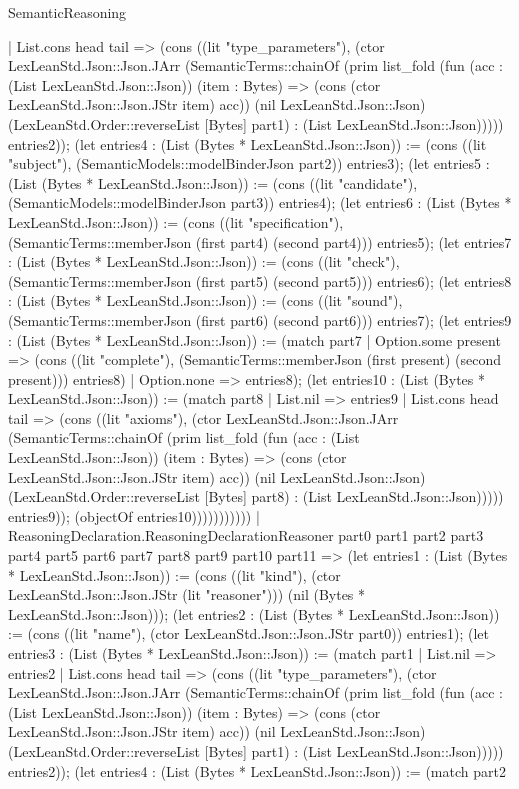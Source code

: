 \begin{lexlean}{SemanticReasoning}
\begin{semanticmodule}
{      | List.cons head tail => (cons ((lit "type_parameters"), (ctor LexLeanStd.Json::Json.JArr (SemanticTerms::chainOf (prim list_fold (fun (acc : (List LexLeanStd.Json::Json)) (item : Bytes) => (cons (ctor LexLeanStd.Json::Json.JStr item) acc)) (nil LexLeanStd.Json::Json) (LexLeanStd.Order::reverseList [Bytes] part1) : (List LexLeanStd.Json::Json))))) entries2)); (let entries4 : (List (Bytes * LexLeanStd.Json::Json)) := (cons ((lit "subject"), (SemanticModels::modelBinderJson part2)) entries3); (let entries5 : (List (Bytes * LexLeanStd.Json::Json)) := (cons ((lit "candidate"), (SemanticModels::modelBinderJson part3)) entries4); (let entries6 : (List (Bytes * LexLeanStd.Json::Json)) := (cons ((lit "specification"), (SemanticTerms::memberJson (first part4) (second part4))) entries5); (let entries7 : (List (Bytes * LexLeanStd.Json::Json)) := (cons ((lit "check"), (SemanticTerms::memberJson (first part5) (second part5))) entries6); (let entries8 : (List (Bytes * LexLeanStd.Json::Json)) := (cons ((lit "sound"), (SemanticTerms::memberJson (first part6) (second part6))) entries7); (let entries9 : (List (Bytes * LexLeanStd.Json::Json)) := (match part7
      | Option.some present => (cons ((lit "complete"), (SemanticTerms::memberJson (first present) (second present))) entries8)
      | Option.none => entries8); (let entries10 : (List (Bytes * LexLeanStd.Json::Json)) := (match part8
      | List.nil => entries9
      | List.cons head tail => (cons ((lit "axioms"), (ctor LexLeanStd.Json::Json.JArr (SemanticTerms::chainOf (prim list_fold (fun (acc : (List LexLeanStd.Json::Json)) (item : Bytes) => (cons (ctor LexLeanStd.Json::Json.JStr item) acc)) (nil LexLeanStd.Json::Json) (LexLeanStd.Order::reverseList [Bytes] part8) : (List LexLeanStd.Json::Json))))) entries9)); (objectOf entries10)))))))))))
    | ReasoningDeclaration.ReasoningDeclarationReasoner part0 part1 part2 part3 part4 part5 part6 part7 part8 part9 part10 part11 => (let entries1 : (List (Bytes * LexLeanStd.Json::Json)) := (cons ((lit "kind"), (ctor LexLeanStd.Json::Json.JStr (lit "reasoner"))) (nil (Bytes * LexLeanStd.Json::Json))); (let entries2 : (List (Bytes * LexLeanStd.Json::Json)) := (cons ((lit "name"), (ctor LexLeanStd.Json::Json.JStr part0)) entries1); (let entries3 : (List (Bytes * LexLeanStd.Json::Json)) := (match part1
      | List.nil => entries2
      | List.cons head tail => (cons ((lit "type_parameters"), (ctor LexLeanStd.Json::Json.JArr (SemanticTerms::chainOf (prim list_fold (fun (acc : (List LexLeanStd.Json::Json)) (item : Bytes) => (cons (ctor LexLeanStd.Json::Json.JStr item) acc)) (nil LexLeanStd.Json::Json) (LexLeanStd.Order::reverseList [Bytes] part1) : (List LexLeanStd.Json::Json))))) entries2)); (let entries4 : (List (Bytes * LexLeanStd.Json::Json)) := (match part2
}
\end{semanticmodule}
\end{lexlean}
